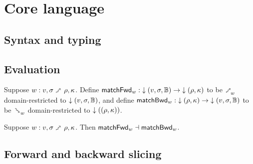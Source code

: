 \section{Core language}

\subsection{Syntax and typing}







\subsection{Evaluation}


\begin{definition}
   Suppose $w: v, \sigma \matchFwdS \rho, \kappa$. Define $\mathsf{matchFwd}_{w}: {\downarrow{(v,\sigma,\mathbb{B})}} \to {\downarrow{(\rho,\kappa)}}$ to be $\matchFwdR{w}$ domain-restricted to ${\downarrow{(v,\sigma,\mathbb{B})}}$, and define $\mathsf{matchBwd}_{w}: {\downarrow{(\rho,\kappa)}} \to {\downarrow{(v,\sigma,\mathbb{B})}}$ to be $\matchBwdR{w}$ domain-restricted to ${\downarrow{((\rho,\kappa))}}$.
\end{definition}

\begin{theorem}
\label{thm:core-language:pattern-matching:gc}
   Suppose $w: v, \sigma \matchFwdS \rho, \kappa$.  Then $\mathsf{matchFwd}_{w} \dashv \mathsf{matchBwd}_{w}$.
\end{theorem}



\subsection{Forward and backward slicing}









